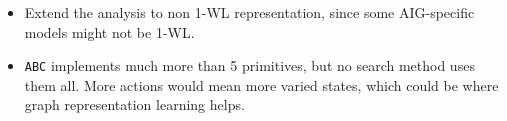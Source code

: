 \documentclass[a0paper,portrait]{baposter}
\begin{document}
\begin{poster}
{\begin{itemize}
    \item Extend the analysis to non 1-WL representation, since some AIG-specific models might not be 1-WL.
    \item \texttt{ABC} implements much more than 5 primitives, but no search method uses them all. More actions would mean more varied states, which could be where graph representation learning helps.
\end{itemize}
}


\end{poster}
\end{document}
